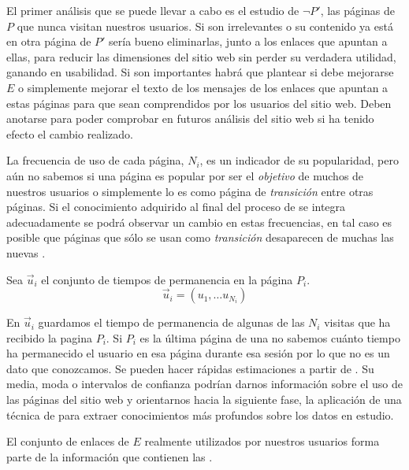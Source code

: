 El primer análisis que se puede llevar a cabo es el estudio de $\neg P'$, las páginas de $P$ que nunca visitan nuestros usuarios. Si son irrelevantes o su contenido ya está en otra página de $P'$ sería bueno eliminarlas, junto a los enlaces que apuntan a ellas, para reducir las dimensiones del sitio web sin perder su verdadera utilidad, ganando en usabilidad. Si son importantes habrá que plantear si debe mejorarse $E$ o simplemente mejorar el texto de los mensajes de los enlaces que apuntan a estas páginas para que sean comprendidos por los usuarios del sitio web. Deben anotarse para poder comprobar en futuros análisis del sitio web si ha tenido efecto el cambio realizado.

La frecuencia de uso de cada página, $N_i$, es un indicador de su popularidad, pero aún no sabemos si una página es popular por ser el \emph{objetivo} de muchos de nuestros usuarios o simplemente lo es como página de \emph{transición} entre otras páginas. Si el conocimiento adquirido al final del proceso de \WUM se integra adecuadamente se podrá observar un cambio en estas frecuencias, en tal caso es posible que páginas que sólo se usan como \emph{transición} desaparecen de muchas las nuevas \sns.

\begin{defn}\label{def:1-2-4-tiempoPermanencia:paginasVisitadasSW}
   Sea $\overrightarrow{u}_i$ el conjunto de tiempos de permanencia en la página $P_i$.
  \begin{equation}\label{eq:1-2-4-tiempoPermanencia}
    \overrightarrow{u}_i = \left(u_{1}, \ldots u_{N_i}\right)
  \end{equation}
\end{defn}

En $\overrightarrow{u}_i$ guardamos el tiempo de permanencia de algunas de las $N_i$ visitas que ha recibido la pagina $P_i$. Si $P_i$ es la última página de una \sn no sabemos cuánto tiempo ha permanecido el usuario en esa página durante esa sesión por lo que no es un dato que conozcamos. Se pueden hacer rápidas estimaciones a partir de . Su media, moda o intervalos de confianza podrían darnos información sobre el uso de las páginas del sitio web y orientarnos hacia la siguiente fase, la aplicación de una técnica de \DM para extraer conocimientos más profundos sobre los datos en estudio.

El conjunto de enlaces de $E$ realmente utilizados por nuestros usuarios forma parte de la información que contienen las \sns.


